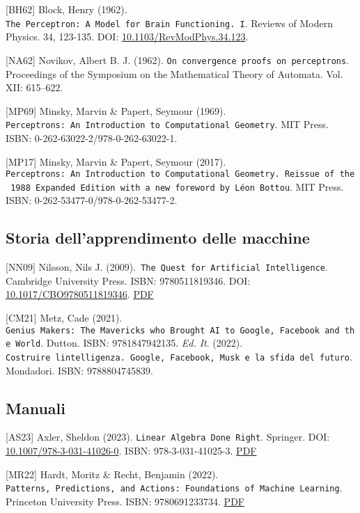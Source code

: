 \documentclass[
  letterpaper,
  DIV=11,
  numbers=noendperiod]{scrreprt}
\begin{document}
{[}BH62{]} Block, Henry (1962).
\texttt{The\ Perceptron:\ A\ Model\ for\ Brain\ Functioning.\ I}.
Reviews of Modern Physics. 34, 123-135. DOI:
\href{https://doi.org/10.1103/RevModPhys.34.123}{10.1103/RevModPhys.34.123}.

{[}NA62{]} Novikov, Albert B. J. (1962).
\texttt{On\ convergence\ proofs\ on\ perceptrons}. Proceedings of the
Symposium on the Mathematical Theory of Automata. Vol. XII: 615--622.

{[}MP69{]} Minsky, Marvin \& Papert, Seymour (1969).
\texttt{Perceptrons:\ An\ Introduction\ to\ Computational\ Geometry}.
MIT Press. ISBN: 0-262-63022-2/978-0-262-63022-1.

{[}MP17{]} Minsky, Marvin \& Papert, Seymour (2017).
\texttt{Perceptrons:\ An\ Introduction\ to\ Computational\ Geometry.\ Reissue\ of\ the\ 1988\ Expanded\ Edition\ with\ a\ new\ foreword\ by\ Léon\ Bottou}.
MIT Press. ISBN: 0-262-53477-0/978-0-262-53477-2.

\subsection{Storia dell'apprendimento delle
macchine}\label{storia-dellapprendimento-delle-macchine}

{[}NN09{]} Nilsson, Nils J.
(2009).~\texttt{The\ Quest\ for\ Artificial\ Intelligence}. Cambridge
University Press. ISBN: 9780511819346. DOI:
\href{https://doi.org/10.1017/CBO9780511819346}{10.1017/CBO9780511819346}.
\href{https://ai.stanford.edu/~nilsson/QAI/qai.pdf}{PDF}

{[}CM21{]} Metz, Cade (2021).
\texttt{Genius\ Makers:~The\ Mavericks\ who\ Brought\ AI\ to\ Google,\ Facebook\ and\ the\ World}.
Dutton. ISBN: 9781847942135. \emph{Ed. It}. (2022).
\texttt{Costruire\ l\textquotesingle{}intelligenza.\ Google,\ Facebook,\ Musk\ e\ la\ sfida\ del\ futuro}.
Mondadori. ISBN: 9788804745839.

\subsection{Manuali}\label{manuali}

{[}AS23{]} Axler, Sheldon (2023). \texttt{Linear\ Algebra\ Done\ Right}.
Springer. DOI:
\href{https://doi.org/10.1007/978-3-031-41026-0}{10.1007/978-3-031-41026-0}.
ISBN: 978-3-031-41025-3.
\href{https://link.springer.com/content/pdf/10.1007/978-3-031-41026-0.pdf}{PDF}

{[}MR22{]} Hardt, Moritz \& Recht, Benjamin (2022).
\texttt{Patterns,\ Predictions,\ and\ Actions:\ Foundations\ of\ Machine\ Learning}.
Princeton University Press. ISBN: 9780691233734.
\href{https://mlstory.org/pdf/patterns.pdf}{PDF}
\end{document}
